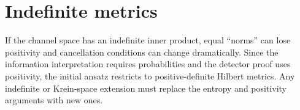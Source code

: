 \section{Indefinite metrics}

If the channel space has an indefinite inner product, equal ``norms'' can lose positivity and cancellation conditions can change dramatically. Since the information interpretation requires probabilities and the detector proof uses positivity, the initial ansatz restricts to positive-definite Hilbert metrics. Any indefinite or Krein-space extension must replace the entropy and positivity arguments with new ones.

